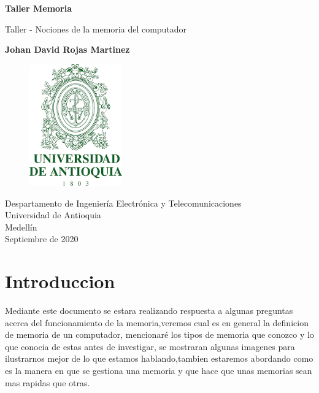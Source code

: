 \documentclass{article}
\begin{document}
\begin{titlepage}
    \begin{center}
        \vspace*{1cm}
            
        \Huge
        \textbf{Taller Memoria}
            
        \vspace{0.5cm}
        \LARGE
        Taller - Nociones de la memoria del computador
            
        \vspace{1.5cm}
            
        \textbf{Johan David Rojas Martinez}
            
        \vfill
            
        \vspace{0.8cm}
       
        \Large
\begin{figure}[h]
\includegraphics[width=4cm]{logoudea.png}
\centering
\end{figure}

        \vfill
        Despartamento de Ingeniería Electrónica y Telecomunicaciones\\
        Universidad de Antioquia\\
        Medellín\\
        Septiembre de 2020
                 
    \end{center}
\end{titlepage}

\tableofcontents

\section{Introduccion}
Mediante este documento se estara realizando respuesta a algunas preguntas acerca del funcionamiento de la memoria,veremos cual es en general la definicion de memoria de un computador, mencionaré los tipos de memoria que conozco y lo que conocia de estas antes de investigar, se mostraran algunas imagenes para ilustrarnos mejor de lo que estamos hablando,tambien estaremos abordando como es la manera en que se gestiona una memoria y que hace que unas memorias sean mas rapidas que otras. 
\end{document}
